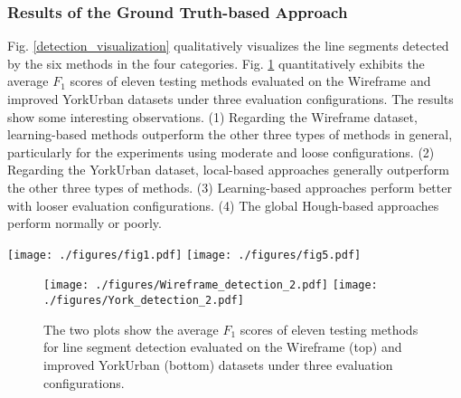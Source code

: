 \documentclass[journal,compsoc]{IEEEtran}
\begin{document}
\subsubsection{Results of the Ground Truth-based Approach}
Fig. \ref{detection_visualization} qualitatively visualizes the line segments detected by the six methods in the four categories. Fig. \ref{Wireframe_YorkUrban_detection} quantitatively exhibits the average $F_1$ scores of eleven testing methods evaluated on the Wireframe and improved YorkUrban datasets under three evaluation configurations. The results show some interesting observations. (1) Regarding the Wireframe dataset, learning-based methods outperform the other three types of methods in general, particularly for the experiments using moderate and loose configurations. (2) Regarding the YorkUrban dataset, local-based approaches generally outperform the other three types of methods. (3) Learning-based approaches perform better with looser evaluation configurations. (4) The global Hough-based approaches perform normally or poorly.

\begin{figure*}[tbp]
	\centering
	\texttt{[image: ./figures/fig1.pdf]}
	\texttt{[image: ./figures/fig5.pdf]}
	\caption{Line segments of two test images detected by six methods in four categories, detailed in TABLE \ref{test_detection_methods}. The top test image comes from the Wireframe dataset, and the bottom image comes from the YorkUrban dataset.}
	\label{detection_visualization}
\end{figure*}

\begin{figure}[tbp]
	\centering
	\texttt{[image: ./figures/Wireframe\_detection\_2.pdf]}
	\texttt{[image: ./figures/York\_detection\_2.pdf]}	
	\caption{The two plots show the average $F_1$ scores of eleven testing methods for line segment detection evaluated on the Wireframe (top) and improved YorkUrban (bottom) datasets under three evaluation configurations.}
	\label{Wireframe_YorkUrban_detection}
\end{figure}
\end{document}
